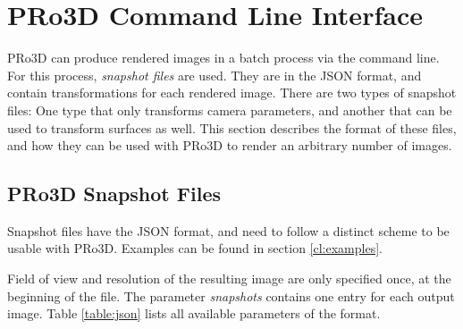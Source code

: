 \section{PRo3D Command Line Interface}

PRo3D can produce rendered images in a batch process via the command line. For this process, \emph{snapshot files} are used. They are in the JSON format, and contain transformations for each rendered image. There are two types of snapshot files: One type that only transforms camera parameters, and another that can be used to transform surfaces as well. This section describes the format of these files, and how they can be used with PRo3D to render an arbitrary number of images.

\subsection{PRo3D Snapshot Files}
\label{sec:snapshots}

Snapshot files have the JSON format, and need to follow a distinct scheme to be usable with PRo3D. Examples can be found in section \ref{cl:examples}.

Field of view and resolution of the resulting image are only specified once, at the beginning of the file. The parameter \textit{snapshots} contains one entry for each output image. Table  \ref{table:json} lists all available parameters of the format.

